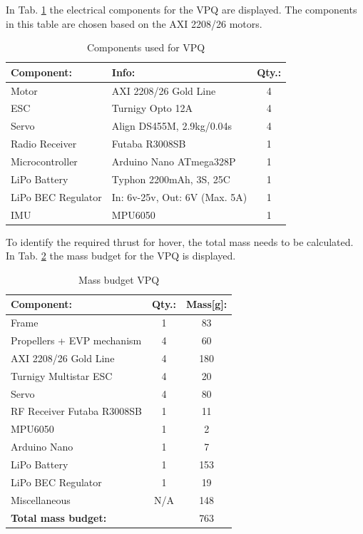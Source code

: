 In Tab. \ref{tab:CompVPQ} the electrical components for the VPQ are displayed. The components in this table are chosen based on the AXI 2208/26 motors. 
\begin{table}[H]
    \begin{center}
    \caption{Components used for VPQ} 
    \label{tab:CompVPQ} 
        \begin{tabular}{|l|l|c|}
            \hline 
            \textbf{Component:} & \textbf{Info:} & \textbf{Qty.:}  \\ 
            \hline
            Motor & AXI 2208/26 Gold Line & 4 \\
            ESC & Turnigy Opto 12A & 4 \\
            Servo & Align DS455M, 2.9kg/0.04s & 4  \\ 
            Radio Receiver & Futaba R3008SB & 1  \\
            Microcontroller & Arduino Nano  ATmega328P& 1 \\
            LiPo Battery & Typhon 2200mAh, 3S, 25C & 1 \\
            LiPo BEC Regulator & In: 6v-25v, Out: 6V (Max. 5A)  & 1\\
            IMU & MPU6050 & 1 \\
            \hline
        \end{tabular}
    \end{center}
\end{table}


To identify the required thrust for hover, the total mass needs to be calculated. In Tab. \ref{tab:WeightVPQ} the mass budget for the VPQ is displayed.
\begin{table}[H]
    \begin{center}
    \caption{Mass budget VPQ} 
    \label{tab:WeightVPQ} 
        \begin{tabular}{|l|c|c|}
            \hline 
            \textbf{Component:} & \textbf{Qty.:} & \textbf{Mass[g]:}  \\ \hline
            Frame & 1 & 83\\
            Propellers + EVP mechanism & 4 & 60\\
            AXI 2208/26 Gold Line  & 4 & 180 \\
            Turnigy Multistar ESC & 4 & 20\\
            Servo & 4 & 80 \\
            RF Receiver Futaba R3008SB & 1 & 11\\
            MPU6050 & 1 & 2 \\
            Arduino Nano & 1 & 7 \\
            LiPo Battery & 1 & 153 \\
            LiPo BEC Regulator & 1 & 19 \\
            Miscellaneous & N/A & 148 \\\hline
            \textbf{Total mass budget:} & & 763 \\
            \hline
        \end{tabular}
    \end{center}
\end{table}

